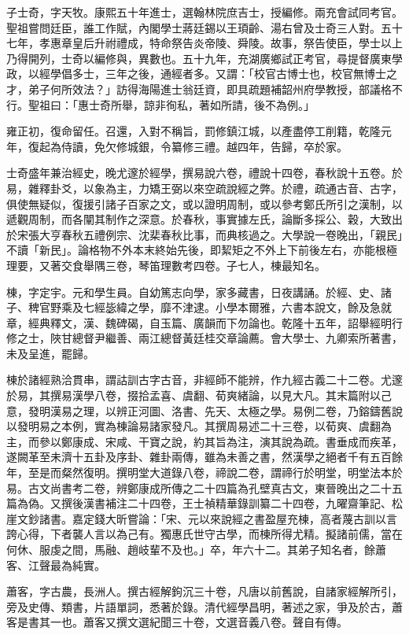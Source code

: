 \begin{pinyinscope}
子士奇，字天牧。康熙五十年進士，選翰林院庶吉士，授編修。兩充會試同考官。聖祖嘗問廷臣，誰工作賦，內閣學士蔣廷錫以王頊齡、湯右曾及士奇三人對。五十七年，孝惠章皇后升祔禮成，特命祭告炎帝陵、舜陵。故事，祭告使臣，學士以上乃得開列，士奇以編修與，異數也。五十九年，充湖廣鄉試正考官，尋提督廣東學政，以經學倡多士，三年之後，通經者多。又謂：「校官古博士也，校官無博士之才，弟子何所效法？」訪得海陽進士翁廷資，即具疏題補韶州府學教授，部議格不行。聖祖曰：「惠士奇所舉，諒非徇私，著如所請，後不為例。」

雍正初，復命留任。召還，入對不稱旨，罰修鎮江城，以產盡停工削籍，乾隆元年，復起為侍讀，免欠修城銀，令纂修三禮。越四年，告歸，卒於家。

士奇盛年兼治經史，晚尤邃於經學，撰易說六卷，禮說十四卷，春秋說十五卷。於易，雜釋卦爻，以象為主，力矯王弼以來空疏說經之弊。於禮，疏通古音、古字，俱使無疑似，復援引諸子百家之文，或以證明周制，或以參考鄭氏所引之漢制，以遞觀周制，而各闡其制作之深意。於春秋，事實據左氏，論斷多採公、穀，大致出於宋張大亨春秋五禮例宗、沈棐春秋比事，而典核過之。大學說一卷晚出，「親民」不讀「新民」。論格物不外本末終始先後，即絜矩之不外上下前後左右，亦能根極理要，又著交食舉隅三卷，琴笛理數考四卷。子七人，棟最知名。

棟，字定宇。元和學生員。自幼篤志向學，家多藏書，日夜講誦。於經、史、諸子、稗官野乘及七經毖緯之學，靡不津逮。小學本爾雅，六書本說文，餘及急就章，經典釋文，漢、魏碑碣，自玉篇、廣韻而下勿論也。乾隆十五年，詔舉經明行修之士，陜甘總督尹繼善、兩江總督黃廷桂交章論薦。會大學士、九卿索所著書，未及呈進，罷歸。

棟於諸經熟洽貫串，謂詁訓古字古音，非經師不能辨，作九經古義二十二卷。尤邃於易，其撰易漢學八卷，掇拾孟喜、虞翻、荀爽緒論，以見大凡。其末篇附以己意，發明漢易之理，以辨正河圖、洛書、先天、太極之學。易例二卷，乃鎔鑄舊說以發明易之本例，實為棟論易諸家發凡。其撰周易述二十三卷，以荀爽、虞翻為主，而參以鄭康成、宋咸、干寶之說，約其旨為注，演其說為疏。書垂成而疾革，遂闕革至未濟十五卦及序卦、雜卦兩傳，雖為未善之書，然漢學之絕者千有五百餘年，至是而粲然復明。撰明堂大道錄八卷，禘說二卷，謂禘行於明堂，明堂法本於易。古文尚書考二卷，辨鄭康成所傳之二十四篇為孔壁真古文，東晉晚出之二十五篇為偽。又撰後漢書補注二十四卷，王士禎精華錄訓纂二十四卷，九曜齋筆記、松崖文鈔諸書。嘉定錢大昕嘗論：「宋、元以來說經之書盈屋充棟，高者蔑古訓以言誇心得，下者襲人言以為己有。獨惠氏世守古學，而棟所得尤精。擬諸前儒，當在何休、服虔之間，馬融、趙岐輩不及也。」卒，年六十二。其弟子知名者，餘蕭客、江聲最為純實。

蕭客，字古農，長洲人。撰古經解鉤沉三十卷，凡唐以前舊說，自諸家經解所引，旁及史傳、類書，片語單詞，悉著於錄。清代經學昌明，著述之家，爭及於古，蕭客是書其一也。蕭客又撰文選紀聞三十卷，文選音義八卷。聲自有傳。


\end{pinyinscope}
